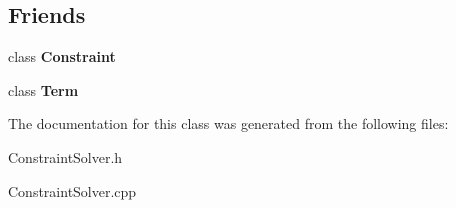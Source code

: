 \subsection*{\-Friends}
\begin{DoxyCompactItemize}
\item 
\hypertarget{classConstraintSolver_a697ed9eaa8955d595a023663ab1e8418}{class {\bfseries \-Constraint}}\label{classConstraintSolver_a697ed9eaa8955d595a023663ab1e8418}

\item 
\hypertarget{classConstraintSolver_a93def3190d5eacce69517079e5886ec2}{class {\bfseries \-Term}}\label{classConstraintSolver_a93def3190d5eacce69517079e5886ec2}

\end{DoxyCompactItemize}


\-The documentation for this class was generated from the following files\-:\begin{DoxyCompactItemize}
\item 
\-Constraint\-Solver.\-h\item 
\-Constraint\-Solver.\-cpp\end{DoxyCompactItemize}

